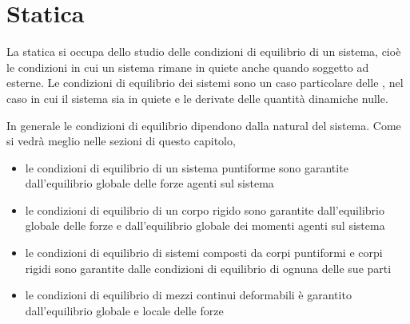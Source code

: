 \documentclass[letterpaper,10pt,italian]{jupyterBook}
\begin{document}
\chapter{Statica}
\label{\detokenize{ch/mechanics/statics:statica}}\label{\detokenize{ch/mechanics/statics:physics-hs-mechanics-statics}}\label{\detokenize{ch/mechanics/statics::doc}}
\sphinxAtStartPar
La statica si occupa dello studio delle condizioni di equilibrio di un sistema, cioè le condizioni in cui un sistema rimane in quiete anche quando soggetto ad {\hyperref[\detokenize{ch/mechanics/actions:physics-hs-mechanics-actions}]{}} esterne. Le condizioni di equilibrio dei sistemi sono un caso particolare delle {\hyperref[\detokenize{ch/mechanics/dynamics:physics-hs-mechanics-dynamics}]{}}, nel caso in cui il sistema sia in quiete e le derivate delle quantità dinamiche nulle.

\sphinxAtStartPar
In generale le condizioni di equilibrio dipendono dalla natural del sistema. Come si vedrà meglio nelle sezioni di questo capitolo,
\begin{itemize}
\item {} 
\sphinxAtStartPar
le condizioni di equilibrio di un sistema puntiforme sono garantite dall’equilibrio globale delle forze agenti sul sistema

\item {} 
\sphinxAtStartPar
le condizioni di equilibrio di un corpo rigido sono garantite dall’equilibrio globale delle forze e dall’equilibrio globale dei momenti agenti sul sistema

\item {} 
\sphinxAtStartPar
le condizioni di equilibrio di sistemi composti da corpi puntiformi e corpi rigidi sono garantite dalle condizioni di equilibrio di ognuna delle sue parti

\item {} 
\sphinxAtStartPar
le condizioni di equilibrio di mezzi continui deformabili è garantito dall’equilibrio globale e locale delle forze

\end{itemize}

\sphinxstepscope
\end{document}
